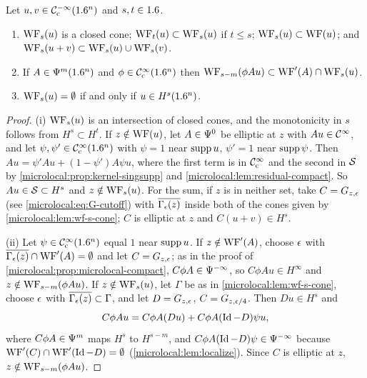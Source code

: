 \begin{proposition}\label{microlocal:prop:wf-s-compact}
  Let $u,v\in\mathcal{C}^{-\infty}_{\mathrm{c}}(1.6^n)$ and $s,t\in1.6$.
  \begin{enumerate}[label=\textup{(\roman*)}]
  \item $\operatorname{WF}_s(u)$ is a closed cone; $\operatorname{WF}_t(u)\subset\operatorname{WF}_s(u)$ if $t\le s$;
    $\operatorname{WF}_s(u)\subset\operatorname{WF}(u)$; and $\operatorname{WF}_s(u+v)\subset\operatorname{WF}_s(u)\cup\operatorname{WF}_s(v)$.
  \item If $A\in\Psi^{m}(1.6^n)$ and $\phi\in\mathcal{C}^\infty_{\mathrm{c}}(1.6^n)$ then
    $\operatorname{WF}_{s-m}(\phi Au)\subset\operatorname{WF}'(A)\cap\operatorname{WF}_s(u)$.
  \item $\operatorname{WF}_s(u)=\emptyset$ if and only if $u\in H^s(1.6^n)$.
  \end{enumerate}
\end{proposition}
\begin{proof}
  (i) $\operatorname{WF}_s(u)$ is an intersection of closed cones, and the monotonicity in
  $s$ follows from $H^s\subset H^t$. If $z\notin\operatorname{WF}(u)$, let $A\in\Psi^{0}$ be
  elliptic at $z$ with $Au\in\mathcal{C}^\infty$, and let $\psi,\psi'\in\mathcal{C}^\infty_{\mathrm{c}}(1.6^n)$ with $\psi=1$
  near $\operatorname{supp} u$, $\psi'=1$ near $\operatorname{supp}\psi$. Then
  $Au=\psi'Au+(1-\psi')A\psi u$, where the first term is in $\mathcal{C}^\infty_{\mathrm{c}}$ and the
  second in $\mathcal{S}$ by \cref{microlocal:prop:kernel-singsupp} and
  \cref{microlocal:lem:residual-compact}. So $Au\in\mathcal{S}\subset H^s$ and
  $z\notin\operatorname{WF}_s(u)$. For the sum, if $z$ is in neither set, take
  $C=G_{z,\epsilon}$ (see \eqref{microlocal:eq:G-cutoff}) with
  $\overline{\Gamma_\epsilon(z)}$ inside both of the cones given by
  \cref{microlocal:lem:wf-s-cone}; $C$ is elliptic at $z$ and
  $C(u+v)\in H^s$.

  (ii) Let $\psi\in\mathcal{C}^\infty_{\mathrm{c}}(1.6^n)$ equal $1$ near $\operatorname{supp} u$. If $z\notin\operatorname{WF}'(A)$,
  choose $\epsilon$ with $\overline{\Gamma_\epsilon(z)}\cap\operatorname{WF}'(A)=\emptyset$ and let
  $C=G_{z,\epsilon}$; as in the proof of \cref{microlocal:prop:microlocal-compact},
  $C\phi A\in\Psi^{-\infty}$, so $C\phi Au\in H^\infty$ and
  $z\notin\operatorname{WF}_{s-m}(\phi Au)$. If $z\notin\operatorname{WF}_s(u)$, let $\Gamma$ be as in
  \cref{microlocal:lem:wf-s-cone}, choose $\epsilon$ with
  $\overline{\Gamma_\epsilon(z)}\subset\Gamma$, and let $D=G_{z,\epsilon}$,
  $C=G_{z,\epsilon/4}$. Then $Du\in H^s$ and
  \begin{equation*}
    C\phi Au=C\phi A(Du)+C\phi A(\operatorname{Id}-D)\psi u,
  \end{equation*}
  where $C\phi A\in\Psi^{m}$ maps $H^s$ to $H^{s-m}$, and
  $C\phi A(\operatorname{Id}-D)\psi\in\Psi^{-\infty}$ because
  $\operatorname{WF}'(C)\cap\operatorname{WF}'(\operatorname{Id}-D)=\emptyset$ (\cref{microlocal:lem:localize}). Since
  $C$ is elliptic at $z$, $z\notin\operatorname{WF}_{s-m}(\phi Au)$.


\end{proof}
